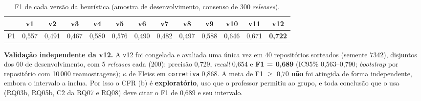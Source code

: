 \begin{table}[ht]
\centering\small
\caption{F1 de cada versão da heurística (amostra de desenvolvimento, consenso de 300 \textit{releases}).}
\label{tab:heuristica}
\setlength{\tabcolsep}{3pt}
\begin{tabular}{lcccccccccccc}
\hline
 & v1 & v2 & v3 & v4 & v5 & v6 & v7 & v8 & v9 & v10 & v11 & v12 \\ \hline
F1 & 0,557 & 0,491 & 0,467 & 0,580 & 0,576 & 0,490 & 0,482 & 0,497 & 0,588 & 0,646 & 0,671 & \textbf{0,722} \\ \hline
\end{tabular}
\end{table}

\textbf{Validação independente da v12.} A v12 foi congelada e avaliada uma única vez em 40 repositórios
sorteados (semente 7342), disjuntos dos 60 de desenvolvimento, com 5 \textit{releases} cada (200): precisão
0,729, \textit{recall} 0,654 e \textbf{F1 = 0,689} (IC95\% 0,563--0,790; \textit{bootstrap} por repositório com
10\,000 reamostragens); $\kappa$ de Fleiss em \texttt{corretiva} 0,868. A meta de F1 $\geq$ 0,70 \textbf{não} foi
atingida de forma independente, embora o intervalo a inclua. Por isso o CFR (b) é \textbf{exploratório}, uso que o
professor permitiu ao grupo, e toda conclusão que o usa
(RQ03b, RQ05b, C2 da RQ07 e RQ08) deve citar o F1 de 0,689 e seu intervalo.
